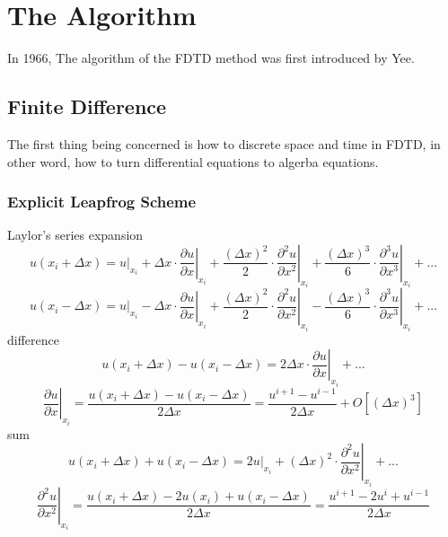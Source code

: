 \section{The Algorithm}

In 1966, The algorithm of the FDTD method was first introduced by Yee.

\subsection{Finite Difference}
The first thing being concerned is how to discrete space and time in FDTD, in other word, how to turn differential
equations to algerba equations.
\subsubsection{Explicit Leapfrog Scheme}
Laylor's series expansion 
\begin{equation}
  u(x_i+\Delta x) = u|_{x_i} + 
  \Delta x\cdot\left.\frac{\partial u}{\partial x}\right|_{x_i} + 
  \frac{(\Delta x)^2}{2}\cdot\left.\frac{\partial ^2 u}{\partial x^2}\right|_{x_i} + 
  \frac{(\Delta x)^3}{6}\cdot\left.\frac{\partial ^3 u}{\partial x^3}\right|_{x_i} + ...
\end{equation}
\begin{equation}
  u(x_i-\Delta x) = u|_{x_i} -
  \Delta x\cdot\left.\frac{\partial u}{\partial x}\right|_{x_i} + 
  \frac{(\Delta x)^2}{2}\cdot\left.\frac{\partial ^2 u}{\partial x^2}\right|_{x_i} -
  \frac{(\Delta x)^3}{6}\cdot\left.\frac{\partial ^3 u}{\partial x^3}\right|_{x_i} + ...
\end{equation}
difference 
\begin{equation}
  u(x_i+\Delta x) - u(x_i-\Delta x) = 2\Delta x\cdot\left.\frac{\partial u}{\partial x}\right|_{x_i}+...
\end{equation}
\begin{equation}
  \left.\frac{\partial u}{\partial x}\right|_{x_i} = \frac{u(x_i+\Delta x) - u(x_i-\Delta x)}{2\Delta x} = \frac{u^{i+1} - u^{i-1}}{2\Delta x} + O[(\Delta x)^3]
\end{equation}
sum 
\begin{equation}
  u(x_i+\Delta x) + u(x_i-\Delta x) = \left.2u\right|_{x_i} + (\Delta x)^2\cdot\left.\frac{\partial ^2 u}{\partial x^2}\right|_{x_i} + ...
\end{equation}
\begin{equation}
  \left.\frac{\partial^2 u}{\partial x^2}\right|_{x_i} = \frac{u(x_i+\Delta x) - 2u(x_i) + u(x_i-\Delta x)}{2\Delta x} = \frac{u^{i+1} - 2u^i + u^{i-1}}{2\Delta x} %
\end{equation}




